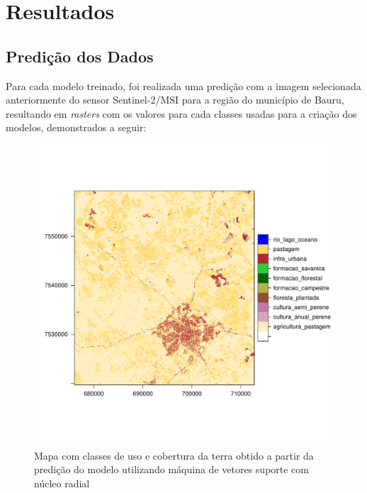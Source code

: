 \section{Resultados}\label{resultados}

\subsection{Predição dos Dados}\label{predicao-dos-dados}

	Para cada modelo treinado, foi realizada uma predição com a imagem
selecionada anteriormente do sensor  Sentinel-2/MSI para a região do
município de Bauru, resultando em \emph{rasters} com os valores para
cada classes usadas para a criação dos modelos, demonstrados a seguir:

\begin{figure}[H]
    \centering
    \caption{Mapa com classes de uso e cobertura da terra obtido a partir da predição do modelo utilizando máquina de vetores suporte com núcleo radial} 
    \includegraphics[scale=0.8]{figs/map_svm-radial.pdf}
\end{figure}
